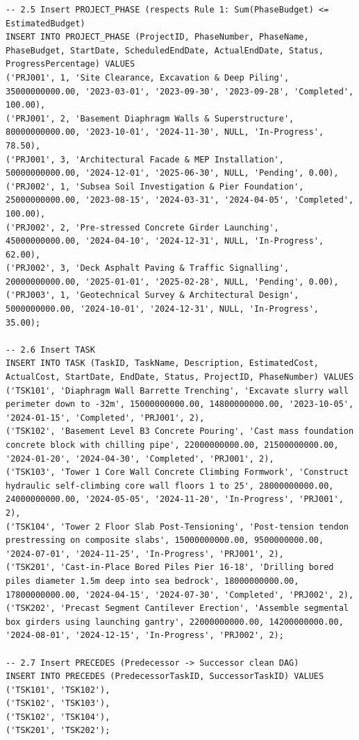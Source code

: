 \documentclass[a4paper,12pt]{report}
\begin{document}
\begin{lstlisting}
-- 2.5 Insert PROJECT_PHASE (respects Rule 1: Sum(PhaseBudget) <= EstimatedBudget)
INSERT INTO PROJECT_PHASE (ProjectID, PhaseNumber, PhaseName, PhaseBudget, StartDate, ScheduledEndDate, ActualEndDate, Status, ProgressPercentage) VALUES
('PRJ001', 1, 'Site Clearance, Excavation & Deep Piling', 35000000000.00, '2023-03-01', '2023-09-30', '2023-09-28', 'Completed', 100.00),
('PRJ001', 2, 'Basement Diaphragm Walls & Superstructure', 80000000000.00, '2023-10-01', '2024-11-30', NULL, 'In-Progress', 78.50),
('PRJ001', 3, 'Architectural Facade & MEP Installation', 50000000000.00, '2024-12-01', '2025-06-30', NULL, 'Pending', 0.00),
('PRJ002', 1, 'Subsea Soil Investigation & Pier Foundation', 25000000000.00, '2023-08-15', '2024-03-31', '2024-04-05', 'Completed', 100.00),
('PRJ002', 2, 'Pre-stressed Concrete Girder Launching', 45000000000.00, '2024-04-10', '2024-12-31', NULL, 'In-Progress', 62.00),
('PRJ002', 3, 'Deck Asphalt Paving & Traffic Signalling', 20000000000.00, '2025-01-01', '2025-02-28', NULL, 'Pending', 0.00),
('PRJ003', 1, 'Geotechnical Survey & Architectural Design', 5000000000.00, '2024-10-01', '2024-12-31', NULL, 'In-Progress', 35.00);

-- 2.6 Insert TASK
INSERT INTO TASK (TaskID, TaskName, Description, EstimatedCost, ActualCost, StartDate, EndDate, Status, ProjectID, PhaseNumber) VALUES
('TSK101', 'Diaphragm Wall Barrette Trenching', 'Excavate slurry wall perimeter down to -32m', 15000000000.00, 14800000000.00, '2023-10-05', '2024-01-15', 'Completed', 'PRJ001', 2),
('TSK102', 'Basement Level B3 Concrete Pouring', 'Cast mass foundation concrete block with chilling pipe', 22000000000.00, 21500000000.00, '2024-01-20', '2024-04-30', 'Completed', 'PRJ001', 2),
('TSK103', 'Tower 1 Core Wall Concrete Climbing Formwork', 'Construct hydraulic self-climbing core wall floors 1 to 25', 28000000000.00, 24000000000.00, '2024-05-05', '2024-11-20', 'In-Progress', 'PRJ001', 2),
('TSK104', 'Tower 2 Floor Slab Post-Tensioning', 'Post-tension tendon prestressing on composite slabs', 15000000000.00, 9500000000.00, '2024-07-01', '2024-11-25', 'In-Progress', 'PRJ001', 2),
('TSK201', 'Cast-in-Place Bored Piles Pier 16-18', 'Drilling bored piles diameter 1.5m deep into sea bedrock', 18000000000.00, 17800000000.00, '2024-04-15', '2024-07-30', 'Completed', 'PRJ002', 2),
('TSK202', 'Precast Segment Cantilever Erection', 'Assemble segmental box girders using launching gantry', 22000000000.00, 14200000000.00, '2024-08-01', '2024-12-15', 'In-Progress', 'PRJ002', 2);

-- 2.7 Insert PRECEDES (Predecessor -> Successor clean DAG)
INSERT INTO PRECEDES (PredecessorTaskID, SuccessorTaskID) VALUES
('TSK101', 'TSK102'),
('TSK102', 'TSK103'),
('TSK102', 'TSK104'),
('TSK201', 'TSK202');


\end{lstlisting}
\end{document}
